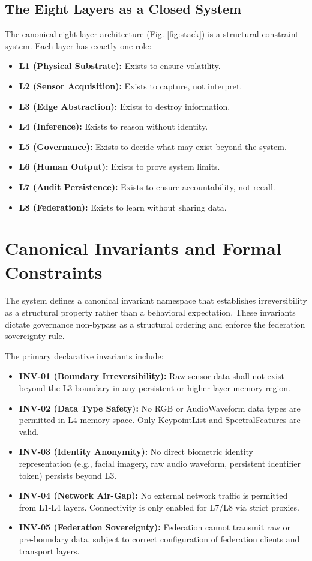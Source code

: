 \documentclass[conference]{IEEEtran}
\begin{document}
\subsection{The Eight Layers as a Closed System}
The canonical eight-layer architecture (Fig. \ref{fig:stack}) is a structural constraint system. Each layer has exactly one role:
\begin{itemize}
    \item \textbf{L1 (Physical Substrate):} Exists to ensure volatility.
    \item \textbf{L2 (Sensor Acquisition):} Exists to capture, not interpret.
    \item \textbf{L3 (Edge Abstraction):} Exists to destroy information.
    \item \textbf{L4 (Inference):} Exists to reason without identity.
    \item \textbf{L5 (Governance):} Exists to decide what may exist beyond the system.
    \item \textbf{L6 (Human Output):} Exists to prove system limits.
    \item \textbf{L7 (Audit Persistence):} Exists to ensure accountability, not recall.
    \item \textbf{L8 (Federation):} Exists to learn without sharing data.
\end{itemize}

\section{Canonical Invariants and Formal Constraints}

The system defines a canonical invariant namespace that establishes irreversibility as a structural property rather than a behavioral expectation. These invariants dictate governance non-bypass as a structural ordering and enforce the federation sovereignty rule.

The primary declarative invariants include:
\begin{itemize}
    \item \textbf{INV-01 (Boundary Irreversibility):} Raw sensor data shall not exist beyond the L3 boundary in any persistent or higher-layer memory region.
    \item \textbf{INV-02 (Data Type Safety):} No RGB or AudioWaveform data types are permitted in L4 memory space. Only KeypointList and SpectralFeatures are valid.
    \item \textbf{INV-03 (Identity Anonymity):} No direct biometric identity representation (e.g., facial imagery, raw audio waveform, persistent identifier token) persists beyond L3.
    \item \textbf{INV-04 (Network Air-Gap):} No external network traffic is permitted from L1-L4 layers. Connectivity is only enabled for L7/L8 via strict proxies.
    \item \textbf{INV-05 (Federation Sovereignty):} Federation cannot transmit raw or pre-boundary data, subject to correct configuration of federation clients and transport layers. 
\end{itemize}
\end{document}
